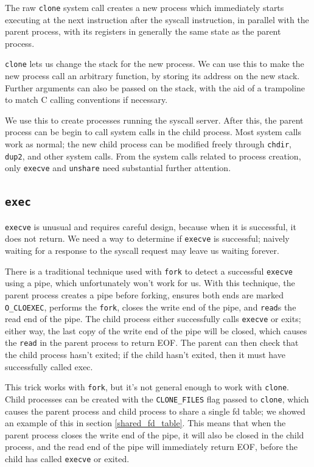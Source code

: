 \documentclass[letterpaper,twocolumn,10pt]{article}
\begin{document}
The raw \texttt{clone} system call creates a new process
which immediately starts executing at the next instruction after the syscall instruction,
in parallel with the parent process,
with its registers in generally the same state as the parent process.

\texttt{clone} lets us change the stack for the new process.
We can use this to make the new process call an arbitrary function,
by storing its address on the new stack.
Further arguments can also be passed on the stack,
with the aid of a trampoline to match C calling conventions if necessary.

We use this to create processes running the syscall server.
After this,
the parent process can be begin to call system calls in the child process.
Most system calls work as normal;
the new child process can be modified freely through \texttt{chdir}, \texttt{dup2}, and other system calls.
From the system calls related to process creation,
only \texttt{execve} and \texttt{unshare} need substantial further attention.
\subsection{\texttt{exec}}\label{execve}
\texttt{execve} is unusual and requires careful design,
because when it is successful, it does not return.
We need a way to determine if \texttt{execve} is successful;
naively waiting for a response to the syscall request may leave us waiting forever.

There is a traditional technique used with \texttt{fork}
to detect a successful \texttt{execve} using a pipe,
which unfortunately won't work for us.
With this technique, the parent process creates a pipe before forking,
ensures both ends are marked \verb|O_CLOEXEC|,
performs the \texttt{fork},
closes the write end of the pipe,
and \texttt{read}s the read end of the pipe.
The child process either successfully calls \texttt{execve} or exits;
either way, the last copy of the write end of the pipe will be closed,
which causes the \texttt{read} in the parent process to return EOF.
The parent can then check that the child process hasn't exited;
if the child hasn't exited, then it must have successfully called exec.

This trick works with \texttt{fork},
but it's not general enough to work with \texttt{clone}.
Child processes can be created with the \verb|CLONE_FILES| flag passed to \texttt{clone},
which causes the parent process and child process to share a single fd table;
we showed an example of this in section \ref{shared_fd_table}.
This means that when the parent process closes the write end of the pipe,
it will also be closed in the child process,
and the read end of the pipe will immediately return EOF,
before the child has called \texttt{execve} or exited.
\end{document}
